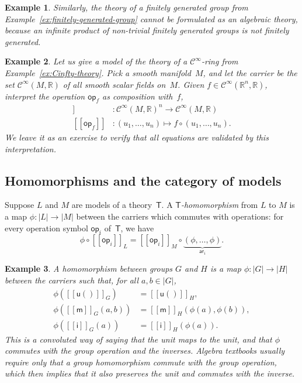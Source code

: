 \documentclass{amsart}
\newcommand{\RR}{\mathbb{R}} %
\newcommand{\theory}[1]{\mathsf{#1}} %
\newcommand{\carrier}[1]{|#1|} %
\newcommand{\op}[1]{\mathsf{op}_{#1}} %
\newcommand{\arity}[1]{\mathsf{ar}_{#1}} %
\newcommand{\Cinfty}{\mathcal{C}^\infty}
\newcommand{\sem}[1]{[\![#1]\!]} %
\newtheorem{example}{Example}[section]
\begin{document}
\begin{example}
  Similarly, the theory of a finitely generated group from
  Example~\ref{ex:finitely-generated-group} cannot be formulated as an algebraic theory,
  because an infinite product of non-trivial finitely generated groups is not finitely
  generated.
\end{example}

\begin{example}
  Let us give a model of the theory of a $\Cinfty$-ring from
  Example~\ref{ex:Cinfty-theory}. Pick a smooth manifold~$M$, and let the carrier be the
  set $\Cinfty(M, \RR)$ of all smooth scalar fields on~$M$. Given
  $f \in \Cinfty(\RR^n, \RR)$, interpret the operation $\op{f}$ as composition with~$f$,
  \begin{align*}
    \sem{\op{f}} &: \Cinfty(M, \RR)^n \to \Cinfty(M, \RR) \\
    \sem{\op{f}} &: (u_1, \ldots, u_n) \mapsto f \circ (u_1, \ldots, u_n).
  \end{align*}
  We leave it as an exercise to verify that all equations are validated by this
  interpretation.
\end{example}

\subsection{Homomorphisms and the category of models}
\label{sec:homom-categ-models}

Suppose $L$ and $M$ are models of a theory~$\theory{T}$. A
\emph{$\theory{T}$-homomorphism} from $L$ to $M$ is a map $\phi : \carrier{L} \to \carrier{M}$ between the
carriers which commutes with operations: for every operation symbol $\op{i}$
of~$\theory{T}$, we have
%
\begin{equation*}
  \phi \circ \sem{\op{i}}_L = \sem{\op{i}}_M \circ \underbrace{(\phi, \ldots, \phi)}_{\arity{i}}.
\end{equation*}

\begin{example}
  A homomorphism between groups $G$ and $H$ is a map $\phi : \carrier{G} \to \carrier{H}$ between the
  carriers such that, for all $a, b \in \carrier{G}$,
  \begin{align*}
    \phi(\sem{\mathsf{u}()}_G) &= \sem{\mathsf{u}()}_H,\\
    \phi(\sem{\mathsf{m}}_G (a,b)) &= \sem{\mathsf{m}}_H (\phi(a), \phi(b)),\\
    \phi(\sem{\mathsf{i}}_G (a)) &= \sem{\mathsf{i}}_H (\phi(a)).
  \end{align*}
  This is a convoluted way of saying that the unit maps to the unit, and that
  $\phi$ commutes with the group operation and the inverses. Algebra textbooks
  usually require only that a group homomorphism commute with the group
  operation, which then implies that it also preserves the unit and commutes
  with the inverse.
\end{example}
\end{document}
